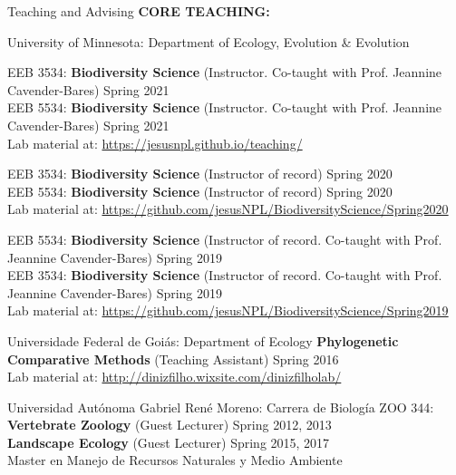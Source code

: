 \documentclass{resume} %
\begin{document}
\begin{rSection}{Teaching and Advising}
\textbf{CORE TEACHING:}

\begin{reSubsection}{University of Minnesota: }{Department of Ecology, Evolution \& Evolution }{}{
EEB 3534: \textbf{Biodiversity Science} (Instructor. Co-taught with Prof. Jeannine Cavender-Bares) \hfill Spring 2021 \\ 
EEB 5534: \textbf{Biodiversity Science} (Instructor. Co-taught with Prof. Jeannine Cavender-Bares) \hfill Spring 2021 \\ 
{Lab material at:
\url{https://jesusnpl.github.io/teaching/}}\smallskip

EEB 3534: \textbf{Biodiversity Science} (Instructor of record) \hfill Spring 2020 \\ 
EEB 5534: \textbf{Biodiversity Science} (Instructor of record) \hfill Spring 2020 \\ 
{Lab material at:
\url{https://github.com/jesusNPL/BiodiversityScience/Spring2020}}\smallskip 

EEB 5534: \textbf{Biodiversity Science} (Instructor of record. Co-taught with Prof. Jeannine Cavender-Bares) \hfill Spring 2019 \\  
EEB 3534: \textbf{Biodiversity Science} (Instructor of record. Co-taught with Prof. Jeannine Cavender-Bares) \hfill Spring 2019 \\ 
{Lab material at:
\url{https://github.com/jesusNPL/BiodiversityScience/Spring2019}}\smallskip 
}
\end{reSubsection}

\begin{reSubsection}{Universidade Federal de Goiás: }{Department of Ecology }{}{
\textbf{Phylogenetic Comparative Methods} (Teaching Assistant) \hfill Spring 2016 \\ 
{Lab material at:
\url{http://dinizfilho.wixsite.com/dinizfilholab/}}\smallskip 
} 
\end{reSubsection}

\begin{reSubsection}{Universidad Autónoma Gabriel René Moreno: }{Carrera de Biología }{}{
ZOO 344: \textbf{Vertebrate Zoology} (Guest Lecturer) \hfill Spring 2012, 2013 \\ \textbf{Landscape Ecology} (Guest Lecturer) \hfill Spring 2015, 2017 \\
{Master en Manejo de Recursos Naturales y Medio Ambiente} \smallskip 
} 
\end{reSubsection}


\end{rSection}
\end{document}
